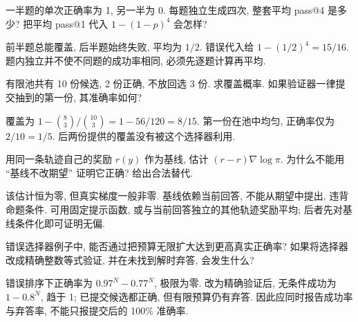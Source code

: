 \label{sec:reason-practice}
\begin{exercise}
一半题的单次正确率为 1, 另一半为 0. 每题独立生成四次, 整套平均 pass@4 是多少? 把平均 pass@1 代入 $1-(1-p)^4$ 会怎样?
\end{exercise}
\begin{solution}
前半题总能覆盖, 后半题始终失败, 平均为 $1/2$. 错误代入给 $1-(1/2)^4=15/16$. 题内独立并不使不同题的成功率相同, 必须先逐题计算再平均.
\end{solution}
\begin{exercise}
有限池共有 10 份候选, 2 份正确, 不放回选 3 份. 求覆盖概率. 如果验证器一律提交抽到的第一份, 其准确率如何?
\end{exercise}
\begin{solution}
覆盖为 $1-\binom83/\binom{10}3=1-56/120=8/15$. 第一份在池中均匀, 正确率仅为 $2/10=1/5$. 后两份提供的覆盖没有被这个选择器利用.
\end{solution}
\begin{exercise}
用同一条轨迹自己的奖励 $r(y)$ 作为基线, 估计 $(r-r)\nabla\log\pi$. 为什么不能用 ``基线不改期望'' 证明它正确? 给出合法替代.
\end{exercise}
\begin{solution}
该估计恒为零, 但真实梯度一般非零. 基线依赖当前回答, 不能从期望中提出, 违背命题条件. 可用固定提示函数, 或与当前回答独立的其他轨迹奖励平均; 后者先对基线条件化即可证明无偏.
\end{solution}
\begin{exercise}
错误选择器例子中, 能否通过把预算无限扩大达到更高真实正确率? 如果将选择器改成精确整数等式验证, 并在未找到解时弃答, 会发生什么?
\end{exercise}
\begin{solution}
错误排序下正确率为 $0.97^N-0.77^N$, 极限为零. 改为精确验证后, 无条件成功为 $1-0.8^N$, 趋于 1; 已提交候选都正确, 但有限预算仍有弃答. 因此应同时报告成功率与弃答率, 不能只报提交后的 100\% 准确率.
\end{solution}
\label{ch:end:10}

